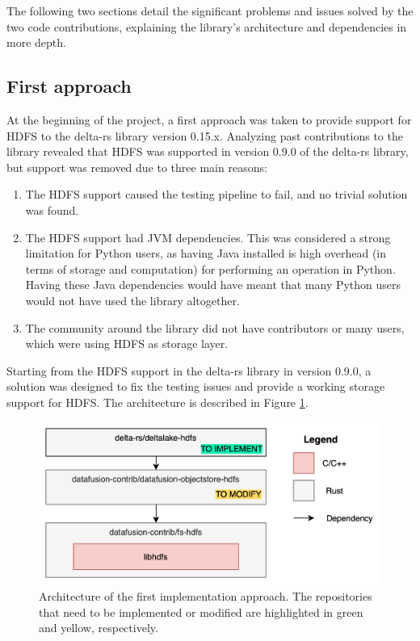The following two sections detail the significant problems and issues solved by the two code contributions, explaining the library's architecture and dependencies in more depth.

\subsection{First approach}
At the beginning of the project, a first approach was taken to provide support for \gls{HDFS} to the delta-rs library version 0.15.x. Analyzing past contributions to the library revealed that \gls{HDFS} was supported in version 0.9.0 of the delta-rs library, but support was removed due to three main reasons:
\begin{enumerate}
  \item The \gls{HDFS} support caused the testing pipeline to fail, and no trivial solution was found.
  \item The \gls{HDFS} support had \gls{JVM} dependencies. This was considered a strong limitation for Python users, as having Java installed is high overhead (in terms of storage and computation) for performing an operation in Python. Having these Java dependencies would have meant that many Python users would not have used the library altogether.
  \item The community around the library did not have contributors or many users, which were using \gls{HDFS} as storage layer.
\end{enumerate}
Starting from the \gls{HDFS} support in the delta-rs library in version 0.9.0, a solution was designed to fix the testing issues and provide a working storage support for \gls{HDFS}. The architecture is described in Figure \ref{fig:approach_1_solution_schema}. 

\begin{figure}[!ht]
  \begin{center}
    \includegraphics[width=\textwidth]{figures/4-implementation/approach1_solution_schema.png}
  \caption[First solution architecture]{Architecture of the first implementation approach. The repositories that need to be implemented or modified are highlighted in green and yellow, respectively.}
  \label{fig:approach_1_solution_schema}
  \end{center}
\end{figure}

